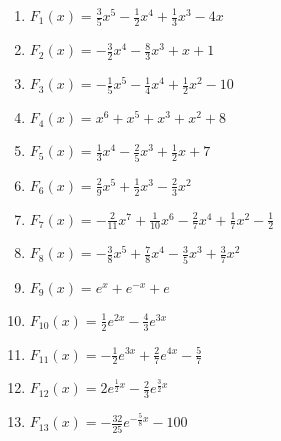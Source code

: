 \begin{Answer}[ref=stammfunktionenA1]
	\begin{enumerate}[label=\alph*)]
		\item \(F_1(x)=\frac{3}{5}x^5-\frac{1}{2}x^4+\frac{1}{3}x^3-4x\)
		\item \(F_2(x)=-\frac{3}{2}x^4-\frac{8}{3}x^3+x+1\)
		\item \(F_3(x)=-\frac{1}{5}x^5-\frac{1}{4}x^4+\frac{1}{2}x^2-10\)
		\item \(F_4(x)=x^6+x^5+x^3+x^2+8\)
		\item \(F_5(x)=\frac{1}{3}x^4-\frac{2}{5}x^3+\frac{1}{2}x+7\)
		\item \(F_6(x)=\frac{2}{9}x^5+\frac{1}{2}x^3-\frac{2}{3}x^2\)
		\item \(F_7(x)=-\frac{2}{11}x^7+\frac{1}{10}x^6-\frac{2}{7}x^4+\frac{1}{7}x^2-\frac{1}{2}\)
		\item \(F_8(x)=-\frac{3}{8}x^5+\frac{7}{8}x^4-\frac{3}{5}x^3+\frac{3}{7}x^2\)
		\item \(F_9(x)=e^x+e^{-x}+e\)
		\item \(F_{10}(x)=\frac{1}{2}e^{2x}-\frac{4}{3}e^{3x}\)
		\item \(F_{11}(x)=-\frac{1}{2}e^{3x}+\frac{2}{7}e^{4x}-\frac{5}{7}\)
		\item \(F_{12}(x)=2e^{\frac{1}{2}x}-\frac{2}{3}e^{\frac{3}{2}x}\)
		\item \(F_{13}(x)=-\frac{32}{25}e^{-\frac{5}{8}x}-100\)
	\end{enumerate}
\end{Answer}
